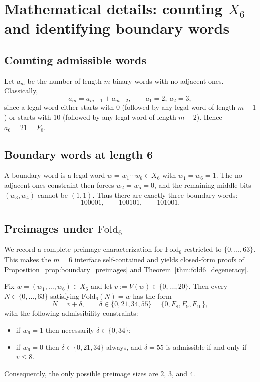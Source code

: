 \section{Mathematical details: counting \texorpdfstring{$X_6$}{X6} and identifying boundary words}
\label{app:math_details}

\subsection{Counting admissible words}

Let $a_m$ be the number of length-$m$ binary words with no adjacent ones.
Classically,
\[
a_m=a_{m-1}+a_{m-2},\qquad a_1=2,\ a_2=3,
\]
since a legal word either starts with $0$ (followed by any legal word of length $m-1$) or starts with $10$ (followed by any legal word of length $m-2$).
Hence $a_6=21=F_8$.

\subsection{Boundary words at length 6}

A boundary word is a legal word $w=w_1\cdots w_6\in X_6$ with $w_1=w_6=1$.
The no-adjacent-ones constraint then forces $w_2=w_5=0$, and the remaining middle bits $(w_3,w_4)$ cannot be $(1,1)$.
Thus there are exactly three boundary words:
\[
100001,\qquad 100101,\qquad 101001.
\]

\subsection{Preimages under \texorpdfstring{$\mathrm{Fold}_6$}{Fold6}}
\label{app:fold6_preimages}

We record a complete preimage characterization for $\mathrm{Fold}_6$ restricted to $\{0,\dots,63\}$.
This makes the $m=6$ interface self-contained and yields closed-form proofs of Proposition~\ref{prop:boundary_preimages} and Theorem~\ref{thm:fold6_degeneracy}.

\begin{proposition}
\label{prop:fold6_preimage_characterization}
Fix $w=(w_1,\dots,w_6)\in X_6$ and let $v:=V(w)\in\{0,\dots,20\}$.
Then every $N\in\{0,\dots,63\}$ satisfying $\mathrm{Fold}_6(N)=w$ has the form
\[
N=v+\delta,
\qquad
\delta\in\{0,21,34,55\}=\{0,F_8,F_9,F_{10}\},
\]
with the following admissibility constraints:
\begin{itemize}
\item if $w_6=1$ then necessarily $\delta\in\{0,34\}$;
\item if $w_6=0$ then $\delta\in\{0,21,34\}$ always, and $\delta=55$ is admissible if and only if $v\le 8$.
\end{itemize}
Consequently, the only possible preimage sizes are $2$, $3$, and $4$.
\end{proposition}

